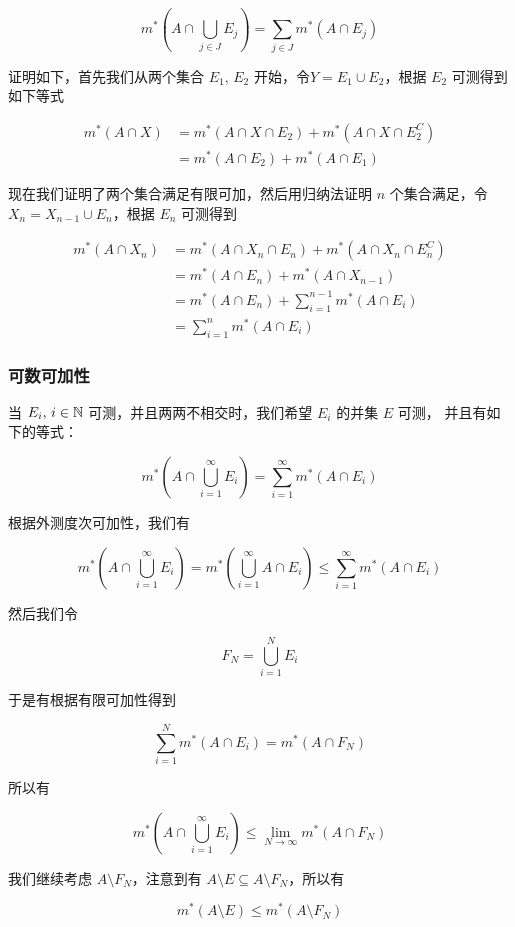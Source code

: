 \[
m^*(A \cap \bigcup_{j \in J}E_j) = \sum_{j \in J}m^*(A \cap E_j)
\]

证明如下，首先我们从两个集合 $E_1, \, E_2$ 开始，令$Y = E_1 \cup E_2$，根据 $E_2$ 可测得到如下等式

\begin{align*}
    m^*(A \cap X) &= m^*(A \cap X \cap E_2) + m^*(A \cap X \cap E_2 ^C) \\
    &= m^*(A \cap E_2) + m^*(A \cap E_1)
\end{align*}

现在我们证明了两个集合满足有限可加，然后用归纳法证明 $n$ 个集合满足，令 $X_n = X_{n-1} \cup E_n$，根据 $E_n$ 可测得到


\begin{align*}
    m^*(A \cap X_n) &= m^*(A \cap X_n \cap E_n) + m^*(A \cap X_n \cap E_n ^C) \\
    &= m^*(A \cap E_n) + m^*(A \cap X_{n-1}) \\
    &= m^*(A \cap E_n) + \sum_{i=1}^{n-1}m^*(A \cap E_i) \\
    &= \sum_{i=1}^{n}m^*(A \cap E_i)
\end{align*}

\subsubsection{可数可加性}

当 $E_i,\, i \in \mathbb{N}$ 可测，并且两两不相交时，我们希望 $E_i$ 的并集 $E$ 可测， 并且有如下的等式：

\[
    m^*(A \cap \bigcup_{i=1}^{\infty}E_i) = \sum_{i=1}^{\infty}m^*(A \cap E_i)
\]

根据外测度次可加性，我们有

\[
m^*(A \cap \bigcup_{i=1}^{\infty}E_i) = m^*(\bigcup_{i =1}^{\infty}A \cap E_i) \le \sum_{i=1}^{\infty}m^*(A \cap E_i)
\]

然后我们令

\[
F_N = \bigcup_{i=1}^{N}E_i
\]

于是有根据有限可加性得到

\[
\sum_{i=1}^{N}m^*(A \cap E_i) = m^*(A \cap F_N)
\]

所以有

\[
m^*(A \cap \bigcup_{i=1}^{\infty}E_i) \le \lim_{N \to \infty}m^*(A \cap F_N)
\]

我们继续考虑 $A \setminus F_N$，注意到有 $A \setminus E \subseteq A \setminus F_N$，所以有

\[
m^*(A \setminus E) \le m^*(A \setminus F_N)
\]

